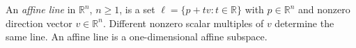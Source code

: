
An \emph{affine line} in $\mathbb R^n$, $n\ge1$, is a set $\ell=\{p+tv:t\in\mathbb R\}$ with $p\in\mathbb R^n$ and nonzero direction vector $v\in\mathbb R^n$. Different nonzero scalar multiples of $v$ determine the same line. An affine line is a one-dimensional affine subspace.
